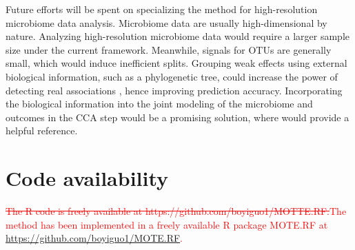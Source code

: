 \documentclass[smallextended]{svjour3}
\newcommand{\bg}[1]{\textcolor{red}{#1}}
\begin{document}
Future efforts will be spent on specializing the method for high-resolution microbiome data analysis. Microbiome data are usually high-dimensional by nature. Analyzing high-resolution microbiome data would require a larger sample size under the current framework. Meanwhile, signals for OTUs are generally small, which would induce inefficient splits. Grouping weak effects using external biological information, such as a phylogenetic tree, could increase the power of detecting real associations \citep{peterson2016joint}, hence improving prediction accuracy. Incorporating the biological information into the joint modeling of the microbiome and outcomes in the CCA step would be a promising solution, where \citet{chen2013structure} would provide a helpful reference. 

\section*{Code availability }
\bg{\st{The R code is  freely available at https://github.com/boyiguo1/MOTTE.RF.}The method has been implemented in a freely available R package MOTE.RF at \url{https://github.com/boyiguo1/MOTE.RF}.}


\end{document}
